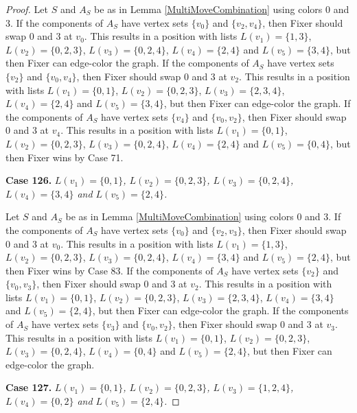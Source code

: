 \documentclass[12pt]{amsart}
\theoremstyle{plain}
\theoremstyle{definition}
\theoremstyle{remark}
\begin{document}
\begin{proof}
Let $S$ and $A_S$ be as in Lemma \ref{MultiMoveCombination} using colors $0$ and $3$. If the components of $A_S$ have vertex sets $\{v_0\}$ and $\{v_2, v_4\}$, then Fixer should swap 0 and 3 at $v_0$. This results in a position with lists $L(v_1) = \{1, 3\}$, $L(v_2) = \{0, 2, 3\}$, $L(v_3) = \{0, 2, 4\}$, $L(v_4) = \{2, 4\}$ and $L(v_5) = \{3, 4\}$, but then Fixer can edge-color the graph.
If the components of $A_S$ have vertex sets $\{v_2\}$ and $\{v_0, v_4\}$, then Fixer should swap 0 and 3 at $v_2$. This results in a position with lists $L(v_1) = \{0, 1\}$, $L(v_2) = \{0, 2, 3\}$, $L(v_3) = \{2, 3, 4\}$, $L(v_4) = \{2, 4\}$ and $L(v_5) = \{3, 4\}$, but then Fixer can edge-color the graph.
If the components of $A_S$ have vertex sets $\{v_4\}$ and $\{v_0, v_2\}$, then Fixer should swap 0 and 3 at $v_4$. This results in a position with lists $L(v_1) = \{0, 1\}$, $L(v_2) = \{0, 2, 3\}$, $L(v_3) = \{0, 2, 4\}$, $L(v_4) = \{2, 4\}$ and $L(v_5) = \{0, 4\}$, but then Fixer wins by Case 71.

\noindent\textbf{Case 126.  }\textit{$L(v_1) = \{0, 1\}$, $L(v_2) = \{0, 2, 3\}$, $L(v_3) = \{0, 2, 4\}$, $L(v_4) = \{3, 4\}$ and $L(v_5) = \{2, 4\}$.}

Let $S$ and $A_S$ be as in Lemma \ref{MultiMoveCombination} using colors $0$ and $3$. If the components of $A_S$ have vertex sets $\{v_0\}$ and $\{v_2, v_3\}$, then Fixer should swap 0 and 3 at $v_0$. This results in a position with lists $L(v_1) = \{1, 3\}$, $L(v_2) = \{0, 2, 3\}$, $L(v_3) = \{0, 2, 4\}$, $L(v_4) = \{3, 4\}$ and $L(v_5) = \{2, 4\}$, but then Fixer wins by Case 83.
If the components of $A_S$ have vertex sets $\{v_2\}$ and $\{v_0, v_3\}$, then Fixer should swap 0 and 3 at $v_2$. This results in a position with lists $L(v_1) = \{0, 1\}$, $L(v_2) = \{0, 2, 3\}$, $L(v_3) = \{2, 3, 4\}$, $L(v_4) = \{3, 4\}$ and $L(v_5) = \{2, 4\}$, but then Fixer can edge-color the graph.
If the components of $A_S$ have vertex sets $\{v_3\}$ and $\{v_0, v_2\}$, then Fixer should swap 0 and 3 at $v_3$. This results in a position with lists $L(v_1) = \{0, 1\}$, $L(v_2) = \{0, 2, 3\}$, $L(v_3) = \{0, 2, 4\}$, $L(v_4) = \{0, 4\}$ and $L(v_5) = \{2, 4\}$, but then Fixer can edge-color the graph.

\noindent\textbf{Case 127.  }\textit{$L(v_1) = \{0, 1\}$, $L(v_2) = \{0, 2, 3\}$, $L(v_3) = \{1, 2, 4\}$, $L(v_4) = \{0, 2\}$ and $L(v_5) = \{2, 4\}$.}


\end{proof}
\end{document}
